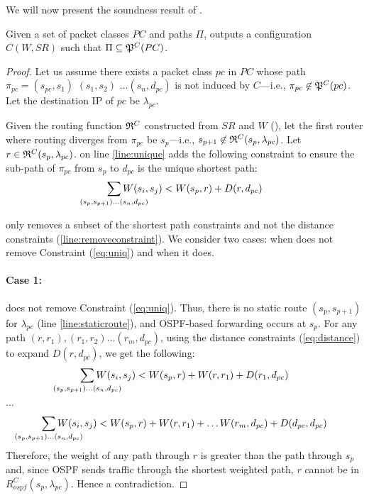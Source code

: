 
We will now present the soundness result of . 
\begin{theorem}
	Given a set of packet classes $PC$ and paths $\Pi$,  outputs
	a configuration $C(W,SR)$ such that $\Pi\subseteq\mathfrak{P}^C(PC)$.
\end{theorem}
\iffull
\begin{proof}
Let us assume there exists a packet class $pc$ in $PC$ whose path $\pi_{pc} =
(s_{pc}, s_1)$ $ (s_1, s_2)$ 
$\ldots (s_n, d_{pc})$ is not induced by $C$---i.e.,
$\pi_{pc} \not\in \mathfrak{P}^C(pc)$. Let the destination IP of $pc$ be
$\lambda_{pc}$.

Given the routing function $\mathfrak{R}^C$ constructed from $SR$ and
$W$ (), let the first router where routing diverges from $\pi_{pc}$ be $s_p$---i.e.,  
$s_{p+1} \not\in \mathfrak{R}^C(s_{p}, \lambda_{pc})$. Let  $r \in \mathfrak{R}^C(s_{p}, \lambda_{pc})$.  
 on line \ref{line:unique} adds the following
constraint to ensure the sub-path of $\pi_{pc}$ 
from $s_{p}$ to $d_{pc}$ is the unique shortest path: 
\begin{equation} \label{eq:uniq}
\sum_{\mathclap{\substack{(s_{p},s_{p+1})\ldots(s_{n},d_{pc})}}} 
W(s_i, s_j) < W(s_{p}, r) + D(r, d_{pc})
\end{equation}

only removes a subset of the shortest path 
constraints and 
not the distance constraints (\ref{line:removeconstraint}). We consider 
two cases: when 
does not remove Constraint (\ref{eq:uniq}) and when it does. 

\paragraph{Case 1:} 
 does not remove Constraint (\ref{eq:uniq}). 
Thus, there is no static route $(s_p, s_{p+1})$ for
$\lambda_{pc}$ (line \ref{line:staticroute}), and 
OSPF-based forwarding occurs at $s_{p}$. 
For any path $(r, r_1), (r_1, r_2) \ldots (r_m, d_{pc})$, 
using the distance constraints (\ref{eq:distance}) to
expand $D(r, d_{pc})$, we get the following: 
\[
\sum_{\mathclap{\substack{(s_{p},s_{p+1})\ldots(s_{n},d_{pc})}}} 
W(s_i, s_j) < W(s_{p}, r) + W(r, r_{1}) + D(r_{1}, d_{pc})
\]
\begin{center}
	$\ldots$
\end{center}
\[
\sum_{\mathclap{\substack{(s_{p},s_{p+1})\ldots(s_{n},d_{pc})}}} 
W(s_i, s_j) < W(s_{p}, r) + W(r, r_{1}) + \ldots W(r_{m}, d_{pc}) + D(d_{pc}, d_{pc})
\]
Therefore, the weight of any path through $r$ is greater than 
the path through $s_{p}$ and, since
OSPF sends traffic through the shortest weighted
path, $r$ cannot be in $R^C_{ospf}(s_p, \lambda_{pc})$.
Hence a contradiction. 


\end{proof}
